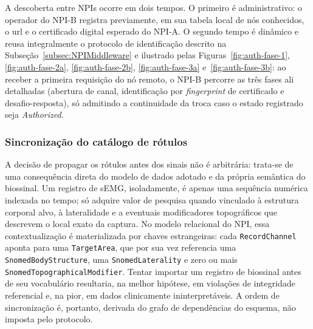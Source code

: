 A descoberta entre NPIs ocorre em dois tempos. O primeiro é administrativo: o operador do NPI-B registra previamente, em sua tabela local de nós conhecidos, o \gls{url} e o certificado digital esperado do NPI-A. O segundo tempo é dinâmico e reusa integralmente o protocolo de identificação descrito na Subseção~\ref{subsec:NPIMiddleware} e ilustrado pelas Figuras~\ref{fig:auth-fase-1}, \ref{fig:auth-fase-2a}, \ref{fig:auth-fase-2b}, \ref{fig:auth-fase-3a} e~\ref{fig:auth-fase-3b}: ao receber a primeira requisição do nó remoto, o NPI-B percorre as três fases ali detalhadas (abertura de canal, identificação por \textit{fingerprint} de certificado e desafio-resposta), só admitindo a continuidade da troca caso o estado registrado seja \textit{Authorized}.

\subsubsection{Sincronização do catálogo de rótulos}

A decisão de propagar os rótulos antes dos sinais não é arbitrária: trata-se de uma consequência direta do modelo de dados adotado e da própria semântica do biossinal. Um registro de sEMG, isoladamente, é apenas uma sequência numérica indexada no tempo; só adquire valor de pesquisa quando vinculado à estrutura corporal alvo, à lateralidade e a eventuais modificadores topográficos que descrevem o local exato da captura. No modelo relacional do NPI, essa contextualização é materializada por chaves estrangeiras: cada \texttt{RecordChannel} aponta para uma \texttt{TargetArea}, que por sua vez referencia uma \texttt{SnomedBodyStructure}, uma \texttt{SnomedLaterality} e zero ou mais \texttt{SnomedTopographicalModifier}. Tentar importar um registro de biossinal antes de seu vocabulário resultaria, na melhor hipótese, em violações de integridade referencial e, na pior, em dados clinicamente ininterpretáveis. A ordem de sincronização é, portanto, derivada do grafo de dependências do esquema, não imposta pelo protocolo.

